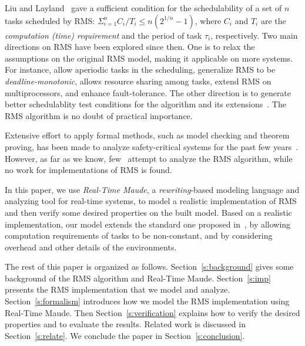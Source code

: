 \documentclass[10pt,journal,compsoc]{IEEEtran}
\begin{document}
Liu and Layland~\cite{DBLP:journals/jacm/LiuL73} gave a sufficient
condition for the schedulability of a set of $n$ tasks scheduled by
RMS: $\displaystyle\Sigma^n_{i=1}C_i/T_i \le n(2^{1/n}-1)$, where
$C_i$ and $T_i$ are the \emph{computation (time) requirement} and the
period of task $\tau_i$, respectively. Two main directions on RMS have
been explored since then. One is to relax the assumptions on the
original RMS model, making it applicable on more systems.  For
instance,
\cite{DBLP:conf/rtss/LehoczkySS87,DBLP:journals/rts/SpruntSL89,DBLP:conf/rtss/LehoczkyR92,DBLP:journals/tc/StrosniderLS95}
allow aperiodic tasks in the scheduling,
\cite{DBLP:journals/pe/LeungW82,audsley1993deadline} generalize RMS to
be \emph{deadline-monotonic}, \cite{DBLP:journals/tc/ShaRL90} allows
resource sharing among tasks,
\cite{dhall1978real,DBLP:journals/rts/LopezGDG03,DBLP:journals/tpds/LopezDG04,DBLP:journals/tc/BaruahG03}
extend RMS on multiprocessors, and
\cite{DBLP:journals/rts/OhS94,DBLP:journals/rts/GhoshMMS98,DBLP:journals/tpds/BertossiMR99}
enhance fault-tolerance. The other direction is to generate better
schedulablity test conditions for the algorithm and its
extensions~\cite{DBLP:conf/rtss/LehoczkySD89,DBLP:conf/rtss/KuoM91,DBLP:journals/tc/BiniBB03,DBLP:journals/rts/LopezGDG03,DBLP:journals/tc/BaruahG03,gardner1999}. The
RMS algorithm is no doubt of practical importance.

Extensive effort to apply formal methods, such as model checking and
theorem proving, has been made to analyze safety-critical systems for
the past few
years~\cite{DBLP:journals/iandc/MeseguerR13,DBLP:journals/cacm/Leroy09,DBLP:conf/sosp/KleinEHACDEEKNSTW09}. However,
as far as we know, few~\cite{DBLP:conf/iceccs/CuiDT14,TianD2011}
attempt to analyze the RMS algorithm, while no work for
implementations of RMS is found.

In this paper, we use \emph{Real-Time Maude}, a \emph{rewriting}-based
modeling language and analyzing tool for real-time systems, to model a
realistic implementation of RMS and then verify some desired
properties on the built model. Based on a realistic implementation,
our model extends the standard one proposed
in~\cite{DBLP:journals/jacm/LiuL73}, by allowing computation
requirements of tasks to be non-constant, and by considering overhead
and other details of the environments.

The rest of this paper is organized as
follows. Section~\ref{s:background} gives some background of the RMS
algorithm and Real-Time Maude.  Section~\ref{s:imp} presents the RMS
implementation that we model and analyze.  Section~\ref{s:formalism}
introduces how we model the RMS implementation using Real-Time
Maude. Then Section~\ref{s:verification} explains how to verify the
desired properties and to evaluate the results. Related work is
discussed in Section~\ref{s:relate}. We conclude the paper in
Section~\ref{s:conclusion}.
\end{document}
